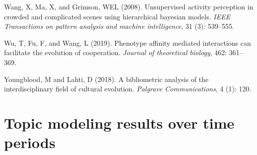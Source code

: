 \documentclass{article}
\theoremstyle{definition}
\begin{document}
\begin{thebibliography}{71}
    Wang, X, Ma, X, and Grimson, WEL (2008).
    \newblock Unsupervised activity perception in crowded and complicated scenes
      using hierarchical bayesian models.
    \newblock \emph{IEEE Transactions on pattern analysis and machine
      intelligence}, 31 (3): 539--555.
    
    Wu, T, Fu, F, and Wang, L (2019).
    \newblock Phenotype affinity mediated interactions can facilitate the evolution
      of cooperation.
    \newblock \emph{Journal of theoretical biology}, 462: 361--369.
    
    Youngblood, M and Lahti, D (2018).
    \newblock A bibliometric analysis of the interdisciplinary field of cultural
      evolution.
    \newblock \emph{Palgrave Communications}, 4 (1): 120.
    
    \end{thebibliography}
    

\appendix

\section{Topic modeling results over time periods}\label{appendix:topics_per_year}
\end{document}
